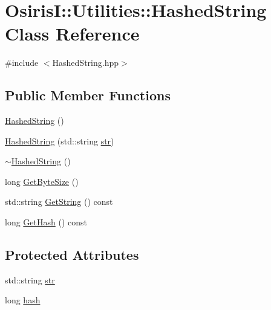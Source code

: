 \hypertarget{class_osiris_i_1_1_utilities_1_1_hashed_string}{\section{Osiris\-I\-:\-:Utilities\-:\-:Hashed\-String Class Reference}
\label{class_osiris_i_1_1_utilities_1_1_hashed_string}
}


{\ttfamily \#include $<$Hashed\-String.\-hpp$>$}

\subsection*{Public Member Functions}
\begin{DoxyCompactItemize}
\item 
\hyperlink{class_osiris_i_1_1_utilities_1_1_hashed_string_a14f7dca8e359530a2a8f8f516d7d7c9e}{Hashed\-String} ()
\item 
\hyperlink{class_osiris_i_1_1_utilities_1_1_hashed_string_a80c65d5f2c5c7572afae87206621ea63}{Hashed\-String} (std\-::string \hyperlink{class_osiris_i_1_1_utilities_1_1_hashed_string_aae46768ab3a0edcf99192458e3bf0046}{str})
\item 
\hyperlink{class_osiris_i_1_1_utilities_1_1_hashed_string_a1f825e0f5098a98d0ea75810de539108}{$\sim$\-Hashed\-String} ()
\item 
long \hyperlink{class_osiris_i_1_1_utilities_1_1_hashed_string_a875c649db0e9bddd42c62b480f0d1c69}{Get\-Byte\-Size} ()
\item 
std\-::string \hyperlink{class_osiris_i_1_1_utilities_1_1_hashed_string_a203514ce2672883bbbf6472a8ff88964}{Get\-String} () const 
\item 
long \hyperlink{class_osiris_i_1_1_utilities_1_1_hashed_string_aa689436cd8d882273da574d46280800d}{Get\-Hash} () const 
\end{DoxyCompactItemize}
\subsection*{Protected Attributes}
\begin{DoxyCompactItemize}
\item 
std\-::string \hyperlink{class_osiris_i_1_1_utilities_1_1_hashed_string_aae46768ab3a0edcf99192458e3bf0046}{str}
\item 
long \hyperlink{class_osiris_i_1_1_utilities_1_1_hashed_string_a9bee254c6edce12abaaf0117747f5d03}{hash}
\end{DoxyCompactItemize}


